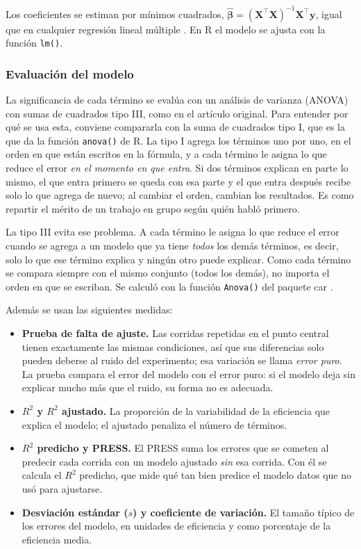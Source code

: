 Los coeficientes se estiman por mínimos cuadrados, $\hat{\bm{\beta}} = (\mathbf{X}^\top\mathbf{X})^{-1}\mathbf{X}^\top\mathbf{y}$, igual que en cualquier regresión lineal múltiple \citep{Montgomery2005}. En R el modelo se ajusta con la función \texttt{lm()}.

\subsubsection{Evaluación del modelo}

La significancia de cada término se evalúa con un análisis de varianza (ANOVA) con sumas de cuadrados tipo III, como en el artículo original. Para entender por qué se usa esta, conviene compararla con la suma de cuadrados tipo I, que es la que da la función \texttt{anova()} de R. La tipo I agrega los términos uno por uno, en el orden en que están escritos en la fórmula, y a cada término le asigna lo que reduce el error \emph{en el momento en que entra}. Si dos términos explican en parte lo mismo, el que entra primero se queda con esa parte y el que entra después recibe solo lo que agrega de nuevo; al cambiar el orden, cambian los resultados. Es como repartir el mérito de un trabajo en grupo según quién habló primero.

La tipo III evita ese problema. A cada término le asigna lo que reduce el error cuando se agrega a un modelo que ya tiene \emph{todos} los demás términos, es decir, solo lo que ese término explica y ningún otro puede explicar. Como cada término se compara siempre con el mismo conjunto (todos los demás), no importa el orden en que se escriban. Se calculó con la función \texttt{Anova()} del paquete \textsf{car} \citep{Fox2019}.

Además se usan las siguientes medidas:
\begin{itemize}
  \item \textbf{Prueba de falta de ajuste.} Las corridas repetidas en el punto central tienen exactamente las mismas condiciones, así que sus diferencias solo pueden deberse al ruido del experimento; esa variación se llama \emph{error puro}. La prueba compara el error del modelo con el error puro: si el modelo deja sin explicar mucho más que el ruido, su forma no es adecuada.
  \item \textbf{$R^2$ y $R^2$ ajustado.} La proporción de la variabilidad de la eficiencia que explica el modelo; el ajustado penaliza el número de términos.
  \item \textbf{$R^2$ predicho y PRESS.} El PRESS suma los errores que se cometen al predecir cada corrida con un modelo ajustado \emph{sin} esa corrida. Con él se calcula el $R^2$ predicho, que mide qué tan bien predice el modelo datos que no usó para ajustarse.
  \item \textbf{Desviación estándar ($s$) y coeficiente de variación.} El tamaño típico de los errores del modelo, en unidades de eficiencia y como porcentaje de la eficiencia media.
\end{itemize}

